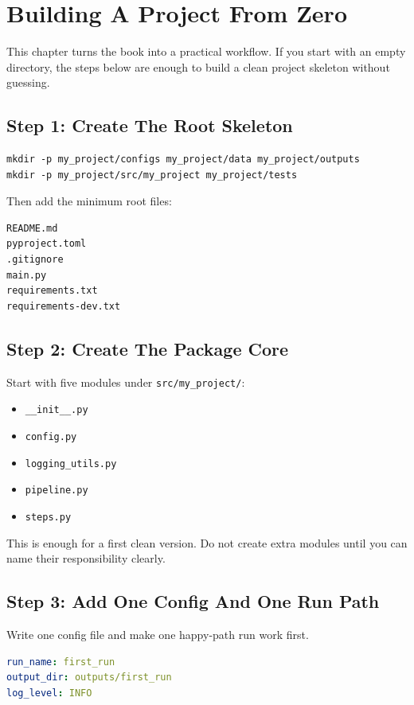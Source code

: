 \documentclass[11pt,oneside]{book}
\begin{document}
\chapter{Building A Project From Zero}

This chapter turns the book into a practical workflow.  
If you start with an empty directory, the steps below are enough to build a clean project skeleton without guessing.

\section*{Step 1: Create The Root Skeleton}

\begin{lstlisting}[style=bookcode]
mkdir -p my_project/configs my_project/data my_project/outputs
mkdir -p my_project/src/my_project my_project/tests
\end{lstlisting}

Then add the minimum root files:
\begin{lstlisting}[style=bookcode]
README.md
pyproject.toml
.gitignore
main.py
requirements.txt
requirements-dev.txt
\end{lstlisting}

\section*{Step 2: Create The Package Core}

Start with five modules under \texttt{src/my\_project/}:
\begin{itemize}
  \item \texttt{\_\_init\_\_.py}
  \item \texttt{config.py}
  \item \texttt{logging\_utils.py}
  \item \texttt{pipeline.py}
  \item \texttt{steps.py}
\end{itemize}

This is enough for a first clean version.  
Do not create extra modules until you can name their responsibility clearly.

\section*{Step 3: Add One Config And One Run Path}

Write one config file and make one happy-path run work first.

\begin{lstlisting}[style=bookcode,language=yaml]
run_name: first_run
output_dir: outputs/first_run
log_level: INFO
\end{lstlisting}
\end{document}
